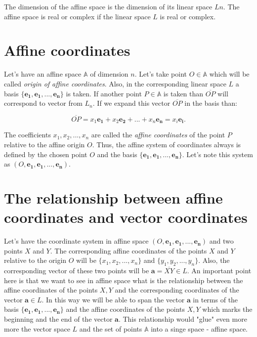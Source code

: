 \documentclass{book}
\begin{document}
The dimension of the affine space is the dimension of its linear space $Ln$. The affine space is real or complex if the linear space $L$ is real or complex.

\section{Affine coordinates}

Let's have an affine space $\mathbb{A}$ of dimension $n$. Let's take point $O \in \mathbb{A}$ which will be called \emph{origin of affine coordinates}. Also, in the corresponding linear space $L$ a basis $\{\boldsymbol{e_1}, \boldsymbol{e_1}, ..., \boldsymbol{e_n}\}$ is taken. If another point $P \in \mathbb{A}$ is taken than $\overline{OP}$ will correspond to vector from $L_n$.
If we expand this vector $\overline{OP}$ in the basis than:

\begin{equation}
\overline{OP} = x_1\boldsymbol{e_1} + x_2\boldsymbol{e_2} + ... + x_n\boldsymbol{e_n} = x_i\boldsymbol{e_i}.
\end{equation}

The coefficients $x_1, x_2, ..., x_n$ are called the \emph{affine coordinates} of the point $P$ relative to the affine origin $O$. Thus, the affine system of coordinates always is defined by the chosen point $O$ and the basis $\{\boldsymbol{e_1}, \boldsymbol{e_1}, ..., \boldsymbol{e_n}\}$. Let's note this system as $(O, \boldsymbol{e_1}, \boldsymbol{e_1}, ..., \boldsymbol{e_n})$.

\section{The relationship between affine coordinates and vector coordinates}

Let's have the coordinate system in affine space $(O, \boldsymbol{e_1}, \boldsymbol{e_1}, ..., \boldsymbol{e_n})$ and two points $X$ and $Y$. The corresponding affine coordinates of the points $X$ and $Y$ relative to the origin $O$ will be $\{x_1, x_2, ..., x_n\}$ and $\{y_1, y_2, ..., y_n\}$. Also, the corresponding vector of these two points will be $\boldsymbol{a} = \overline{XY} \in L$. An important point here is that we want to see in affine space what is the relationship between the affine coordinates of the points $X, Y$ and the corresponding coordinates of the vector $\boldsymbol{a} \in L$. In this way we will be able to span the vector $\boldsymbol{a}$ in terms of the basis $\{\boldsymbol{e_1}, \boldsymbol{e_1}, ..., \boldsymbol{e_n}\}$ and the affine coordinates of the points $X, Y$ which marks the beginning and the end of the vector $\boldsymbol{a}$. This relationship would "glue" even more more the vector space $L$ and the set of points $\mathbb{A}$ into a singe space - affine space.
\end{document}

